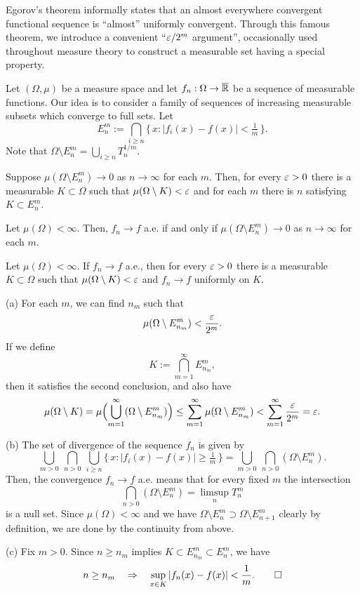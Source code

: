 \documentclass{../note}
\begin{document}
\begin{prb}
Egorov's theorem informally states that an almost everywhere convergent functional sequence is ``almost'' uniformly convergent.
Through this famous theorem, we introduce a convenient ``$\varepsilon/2^m$ argument'', occasionally used throughout measure theory to construct a measurable set having a special property.

Let $(\Omega,\mu)$ be a measure space and let $f_n:\Omega\to\overline{\mathbb{R}}$ be a sequence of measurable functions.
Our idea is to consider a family of sequences of increasing measurable subsets which converge to full sets.
Let
\[E_n^m:=\bigcap_{i\ge n}\{\,x:|f_i(x)-f(x)|<\tfrac1m\,\}.\]
Note that $\Omega\setminus E_n^m=\bigcup_{i\ge n}T_n^{1/m}$.
\begin{parts}
\item Suppose $\mu(\Omega\setminus E_n^m)\to0$ as $n\to\infty$ for each $m$. Then, for every $\varepsilon>0$ there is a measurable $K\subset\Omega$ such that $\mu(\Omega\setminus K)<\varepsilon$ and for each $m$ there is $n$ satisfying $K\subset E_n^m$.
\item Let $\mu(\Omega)<\infty$. Then, $f_n\to f$ a.e. if and only if $\mu(\Omega\setminus E_n^m)\to0$ as $n\to\infty$ for each $m$.
\item Let $\mu(\Omega)<\infty$. If $f_n\to f$ a.e., then for every $\varepsilon>0$ there is a measurable $K\subset\Omega$ such that $\mu(\Omega\setminus K)<\varepsilon$ and $f_n\to f$ uniformly on $K$.
\end{parts}
\end{prb}
\begin{pf}
(a)
For each $m$, we can find $n_m$ such that
\[\mu(\Omega\setminus E_{n_m}^m)<\frac{\varepsilon}{2^m}.\]
If we define
\[K:=\bigcap_{m=1}^\infty E_{n_m}^m,\]
then it satisfies the second conclusion, and also have
\[\mu(\Omega\setminus K)=\mu\Bigl(\bigcup_{m=1}^\infty(\Omega\setminus E_{n_m}^m)\Bigr)\le\sum_{m=1}^\infty\mu(\Omega\setminus E_{n_m}^m)<\sum_{m=1}^\infty\frac{\varepsilon}{2^m}=\varepsilon.\]

(b)
The set of divergence of the sequence $f_n$ is given by
\[\bigcup_{m>0}\ \bigcap_{n>0}\ \bigcup_{i\ge n}\{\,x:|f_i(x)-f(x)|\ge\tfrac1m\,\}=\bigcup_{m>0}\ \bigcap_{n>0}(\Omega\setminus E_n^m).\]
Then, the convergence $f_n\to f$ a.e. means that for every fixed $m$ the intersection
\[\bigcap_{n>0}(\Omega\setminus E_n^m)=\limsup_nT_n^m\]
is a null set.
Since $\mu(\Omega)<\infty$ and we have $\Omega\setminus E_n^m\supset\Omega\setminus E_{n+1}^m$ clearly by definition, we are done by the continuity from above.

(c)
Fix $m>0$.
Since $n\ge n_m$ implies $K\subset E_{n_m}^m\subset E_n^m$, we have
\[n\ge n_m\quad\Rightarrow\quad\sup_{x\in K}|f_n(x)-f(x)|<\frac1m.\qedhere\]
\end{pf}
\end{document}
